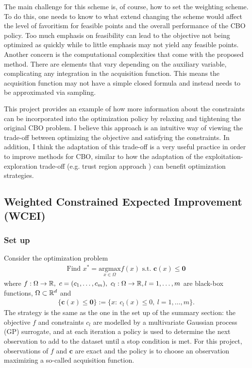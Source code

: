 The main challenge for this scheme is, of course, how to set the weighting scheme. To do this, one needs to know to what extend changing the scheme would affect the level of favoritism for feasible points and the overall performance of the CBO policy. Too much emphasis on feasibility can lead to the objective not being optimized as quickly while to little emphasis may not yield any feasible points. Another concern is the computational complexities that come with the proposed method. There are elements that vary depending on the auxiliary variable, complicating any integration in the acquisition function. This means the acquisition function may not have a simple closed formula and instead needs to be approximated via sampling.

This project provides an example of how more information about the constraints can be incorporated into the optimization policy by relaxing and tightening the original CBO problem. I believe this approach is an intuitive way of viewing the trade-off between optimizing the objective and satisfying the constraints. In addition, I think the adaptation of this trade-off is a very useful practice in order to improve methods for CBO, similar to how the adaptation of the exploitation-exploration trade-off (e.g. trust region approach \cite{eriksson2019scalable,eriksson2021scalable}) can benefit optimization strategies. 

\subsection{Weighted Constrained Expected Improvement (WCEI)}
\subsubsection{Set up}
Consider the optimization problem
\begin{align}
    \text{Find }x^*=\underset{x\in \Omega}{\text{argmax}}f(x)\text{ s.t. }\textbf{c}(x)\le \textbf{0}
\end{align}
where $f:\Omega\to\bbR,\ c = (c_1,\ldots,c_m),\ c_l:\Omega\to\bbR,l=1,\ldots,m$ are black-box functions, $\Omega\subset \mathbb{R}^d$ and
\begin{align}
    \{\textbf{c}(x)\le \textbf{0}\} := \{x:\ c_l(x)\le 0,\ l=1,\ldots,m\}.
\end{align}
The strategy is the same as the one in the set up of the summary section: the objective $f$ and constraints $c_l$ are modelled by a multivariate Gaussian process (GP) surrogate, and at each iteration a policy is used to determine the next observation to add to the dataset until a stop condition is met. For this project, observations of $f$ and $\textbf{c}$ are exact and the policy is to choose an observation maximizing a so-called acquisition function.

